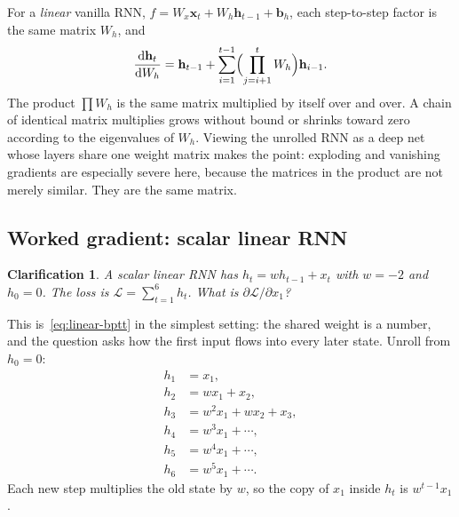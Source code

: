 \documentclass[11pt]{article}
\newtheorem*{clarification}{Clarification}
\begin{document}
For a \emph{linear} vanilla RNN,
\(f=W_x\mathbf{x}_t+W_h\mathbf{h}_{t-1}+\mathbf{b}_h\), each
step-to-step factor is the same matrix \(W_h\), and
\begin{equation}
\label{eq:linear-bptt}
\frac{\mathrm{d}\mathbf{h}_t}{\mathrm{d}W_h}
=
\mathbf{h}_{t-1}
+
\sum_{i=1}^{t-1}
\Bigl(\prod_{j=i+1}^{t} W_h\Bigr)
\mathbf{h}_{i-1}.
\end{equation}
The product \(\prod W_h\) is the same matrix multiplied by itself over and
over. A chain of identical matrix multiplies grows without bound or shrinks
toward zero according to the eigenvalues of \(W_h\). Viewing the unrolled
RNN as a deep net whose layers share one weight matrix makes the point:
exploding and vanishing gradients are especially severe here, because the
matrices in the product are not merely similar. They are the same matrix.

\subsection{Worked gradient: scalar linear RNN}
\label{sec:q3}

\begin{clarification}
A scalar linear RNN has \(h_t=w h_{t-1}+x_t\) with \(w=-2\) and \(h_0=0\).
The loss is \(\mathcal{L}=\sum_{t=1}^{6} h_t\). What is
\(\partial\mathcal{L}/\partial x_1\)?
\end{clarification}

This is~\eqref{eq:linear-bptt} in the simplest setting: the shared weight is
a number, and the question asks how the first input flows into every later
state. Unroll from \(h_0=0\):
\begin{align*}
h_1 &= x_1, \\
h_2 &= w x_1+x_2, \\
h_3 &= w^2 x_1+w x_2+x_3, \\
h_4 &= w^3 x_1+\cdots, \\
h_5 &= w^4 x_1+\cdots, \\
h_6 &= w^5 x_1+\cdots.
\end{align*}
Each new step multiplies the old state by \(w\), so the copy of \(x_1\)
inside \(h_t\) is \(w^{t-1}x_1\).
\end{document}
